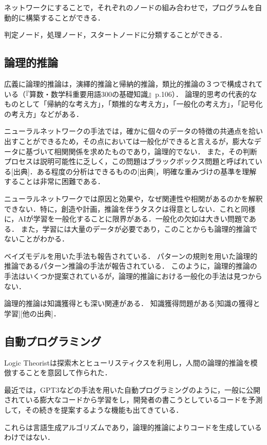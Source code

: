 \documentclass[exploratorypaper]{jsaiart} %
\begin{document}
ネットワークにすることで，それぞれのノードの組み合わせで，プログラムを自動的に構築することができる．

判定ノード，処理ノード，スタートノードに分類することができる．

\subsection{論理的推論}
広義に論理的推論は，演繹的推論と帰納的推論，類比的推論の３つで構成されている（『算数・数学科重要用語300の基礎知識』p.106）．
論理的思考の代表的なものとして「帰納的な考え方」，「類推的な考え方」，「一般化の考え方」，「記号化の考え方」などがある\cite{saito:11}．

ニューラルネットワークの手法では，確かに個々のデータの特徴の共通点を拾い出すことができるため，その点においては一般化ができると言えるが，膨大なデータに基づいて相関関係を求めたものであり，論理的でない．
また，その判断プロセスは説明可能性に乏しく，この問題はブラックボックス問題と呼ばれている[出典]．ある程度の分析はできるものの[出典]，明確な重みづけの基準を理解することは非常に困難である．

ニューラルネットワークでは原因と効果や，なぜ関連性や相関があるのかを解釈できない．特に，創造や計画，推論を伴うタスクは得意としない．これと同様に，AIが学習を一般化することに限界がある．一般化の欠如は大きい問題である．
また，学習には大量のデータが必要であり，このことからも論理的推論でないことがわかる．

ベイズモデルを用いた手法も報告されている\cite{TENENBAUM2006}．
パターンの規則を用いた論理的推論であるパターン推論の手法が報告されている\cite{tsukimoto:00}\cite{sudo:07}．
このように，論理的推論の手法はいくつか提案されているが，論理的推論における一般化の手法は見つからない．

論理的推論は知識獲得とも深い関連がある．
知識獲得問題がある\cite{KnowledgeAI}[知識の獲得と学習][他の出典]．
\subsection{自動プログラミング}
Logic Theorist\cite{LogicTheorist}は探索木とヒューリスティクスを利用し，人間の論理的推論を模倣することを意図して作られた．

最近では，GPT3\cite{gpt3}などの手法を用いた自動プログラミングのように，一般に公開されている膨大なコードから学習をし，開発者の書こうとしているコードを予測して，その続きを提案するような機能も出てきている\cite{copilot}．

これらは言語生成アルゴリズムであり，論理的推論によりコードを生成しているわけではない．
\end{document}
